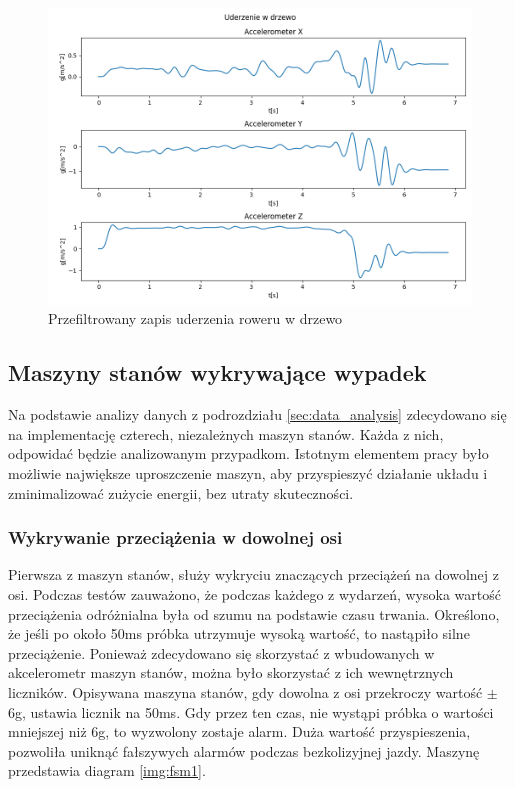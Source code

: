 \begin{figure}[h]
    \centering
    \includegraphics[width=15cm]{Graphics/Tree_title.png}
    \caption{Przefiltrowany zapis uderzenia roweru w drzewo}
    \label{img:tree}
\end{figure}

\subsection{Maszyny stanów wykrywające wypadek}
\label{sec:state_machines}
Na podstawie analizy danych z podrozdziału \ref{sec:data_analysis} zdecydowano się na implementację czterech, niezależnych maszyn stanów. Każda z nich, odpowidać będzie analizowanym przypadkom. Istotnym elementem pracy było możliwie największe uproszczenie maszyn, aby przyspieszyć działanie układu i zminimalizować zużycie energii, bez utraty skuteczności.
\subsubsection{Wykrywanie przeciążenia w dowolnej osi}
Pierwsza z maszyn stanów, służy wykryciu znaczących przeciążeń na dowolnej z osi. Podczas testów zauważono, że podczas każdego z wydarzeń, wysoka wartość przeciążenia odróżnialna była od szumu na podstawie czasu trwania. Określono, że jeśli po około 50ms próbka utrzymuje wysoką wartość, to nastąpiło silne przeciążenie. Ponieważ zdecydowano się skorzystać z wbudowanych w akcelerometr maszyn stanów, można było skorzystać z ich wewnętrznych liczników. Opisywana maszyna stanów, gdy dowolna z osi przekroczy wartość $\pm$6g, ustawia licznik na 50ms. Gdy przez ten czas, nie wystąpi próbka o wartości mniejszej niż 6g, to wyzwolony zostaje alarm. Duża wartość przyspieszenia, pozwoliła uniknąć fałszywych alarmów podczas bezkolizyjnej jazdy. Maszynę przedstawia diagram \ref{img:fsm1}.
\newline
\newline
